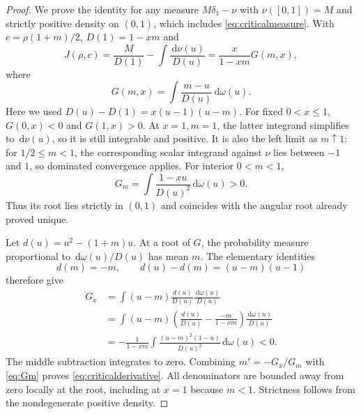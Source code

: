 \documentclass[11pt]{article}
\numberwithin{equation}{section}
\theoremstyle{definition}\newtheorem{definition}[theorem]{Definition}
\theoremstyle{remark}\newtheorem{remark}[theorem]{Remark}
\newcommand{\dd}{\,\mathrm d}
\begin{document}
\begin{proof}
We prove the identity for any measure $M\delta_1-\nu$ with
$\nu([0,1])=M$ and strictly positive density on $(0,1)$, which includes
\eqref{eq:criticalmeasure}. With $c=\rho(1+m)/2$,
$D(1)=1-xm$ and
\[
 J(\rho,c)=\frac{M}{D(1)}-\int\frac{\dd\nu(u)}{D(u)}
 =\frac{x}{1-xm}G(m,x),
\]
where
\begin{equation}\label{eq:criticalG}
 G(m,x)=\int\frac{m-u}{D(u)}\dd\omega(u).
\end{equation}
Here we used
$D(u)-D(1)=x(u-1)(u-m)$.
For fixed $0<x\le1$, $G(0,x)<0$ and $G(1,x)>0$.
At $x=1,m=1$, the latter integrand simplifies to $\dd\nu(u)$,
so it is still integrable and positive. It is also the left limit
as $m\uparrow1$: for $1/2\le m<1$, the corresponding scalar
integrand against $\nu$ lies between $-1$ and $1$, so dominated
convergence applies. For interior $0<m<1$,
\begin{equation}\label{eq:Gm}
 G_m=\int\frac{1-xu}{D(u)^2}\dd\omega(u)>0.
\end{equation}
Thus its root lies strictly in $(0,1)$ and coincides with the
angular root already proved unique.

Let $d(u)=u^2-(1+m)u$. At a root of $G$, the probability measure
proportional to $\dd\omega(u)/D(u)$ has mean $m$. The elementary
identities
\[
 d(m)=-m,\qquad d(u)-d(m)=(u-m)(u-1)
\]
therefore give
\begin{align*}
 G_x
 &=\int (u-m)\frac{d(u)}{D(u)}\frac{\dd\omega(u)}{D(u)}\\
 &=\int (u-m)\left(\frac{d(u)}{D(u)}
                         -\frac{-m}{1-xm}\right)
                         \frac{\dd\omega(u)}{D(u)}\\
 &=-\frac1{1-xm}\int\frac{(u-m)^2(1-u)}{D(u)^2}\dd\omega(u)<0.
\end{align*}
The middle subtraction integrates to zero. Combining
$m'=-G_x/G_m$ with \eqref{eq:Gm} proves
\eqref{eq:criticalderivative}. All denominators are bounded away from
zero locally at the root, including at $x=1$ because $m<1$.
Strictness follows from the nondegenerate positive density.
\end{proof}
\end{document}
